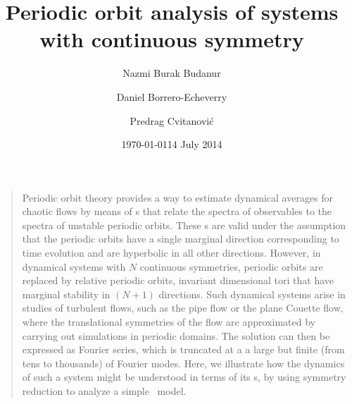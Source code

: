 \documentclass[aip,cha,
reprint,
secnumarabic,
nofootinbib, tightenlines,
nobibnotes, showkeys, showpacs,
groupedaddress,
]{revtex4-1}
\begin{document}
\title[Periodic orbit analysis of systems with continuous symmetry]
{Periodic orbit analysis of systems with continuous symmetry}

\author{Nazmi Burak Budanur}
\author{Daniel Borrero-Echeverry}
\author{Predrag Cvitanovi\'{c}}
    \ifdraft
\date{\today}
    \else
\date{14 July 2014}
   \fi



\maketitle

\begin{quotation}
Periodic orbit theory provides a way to estimate dynamical averages for chaotic flows 
by means of {\cycForm s} that relate the spectra of observables to the spectra of unstable
periodic orbits. These {\cycForm s} are valid under the assumption that the
periodic orbits have a single marginal direction corresponding to time
evolution and are hyperbolic in all other directions. However, in dynamical systems
with $N$ continuous symmetries, periodic orbits are replaced by relative periodic orbits, 
invariant dimensional tori that have marginal stability in $(N+1)$ directions. Such dynamical 
systems arise in studies of turbulent flows, such as the pipe flow or the plane Couette flow, 
where the translational symmetries of the flow are approximated by carrying out simulations 
in periodic domains. The solution can then be expressed as Fourier series, which is truncated 
at a a large but finite (from tens to thousands) of Fourier modes. Here, we illustrate how the 
dynamics of such a system might be understood in terms of its \rpo s, by using symmetry reduction 
to analyze a simple \twomode\ model.
\end{quotation}
\end{document}
